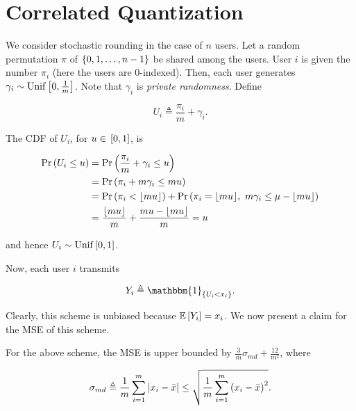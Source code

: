\documentclass[twoside]{article}
\begin{document}



\section{Correlated Quantization}

We consider stochastic rounding in the case of \(n\) users. Let a random 
permutation \(\pi\) of \(\left\{0,1,\ldots,n-1\right\}\) be shared among the users.
User \(i\) is given the number \(\pi_i\) (here the users are 0-indexed). Then,
each user generates \(\gamma_i \sim \mathrm{Unif}{}\left[0,\frac{1}{m}\right]\).
Note that \(\gamma_i\) is \emph{private randomness}. Define

\begin{equation}
    U_i \triangleq \frac{\pi_i}{m} + \gamma_i.
    \label{eq:Ui-def}
\end{equation}

The CDF of \(U_i\), for \(u \in {}\left[0,1\right]\), is

\begin{align}
    \Pr\left(U_i\le u\right) &= \Pr\left(\frac{\pi_i}{m}+ \gamma_i \le u\right) \\
                  &= \Pr\left(\pi_i + m\gamma_i \le mu\right) \\
                  &= \Pr\left(\pi_i < \lfloor mu\rfloor\right) + \Pr\left(\pi_i = \lfloor mu\rfloor,\ m\gamma_i \le \mu - \lfloor mu\rfloor\right) \\
                  &= \frac{\lfloor mu\rfloor}{m} + \frac{mu-\lfloor mu\rfloor}{m} = u
                  \label{eq:ui-cdf}
\end{align}

and hence \(U_i \sim \mathrm{Unif}{}\left[0,1\right]\).

Now, each user \(i\) transmits

\begin{equation}
    Y_i \triangleq \mathbbm{1}_{\cbrak{U_i<x_i}}.
    \label{eq:Yi-def}
\end{equation}

Clearly, this scheme is unbiased because \(\mathbb{E}\left[ Y_i \right] = x_i\). We now present
a claim for the MSE of this scheme.

\begin{claim}
    For the above scheme, the MSE is upper bounded by \(\frac{3}{m}\sigma_{md} + \frac{12}{m^2}\), where

    \begin{equation}
        \sigma_{md} \triangleq \frac{1}{m}\sum_{i=1}^m\left\vert x_i-\bar{x}\right\vert \le \sqrt{\frac{1}{m}\sum_{i=1}^m\left(x_i-\bar{x}\right)^2}.
        \label{eq:sigma-md-def}
    \end{equation}
\end{claim}
\end{document}
